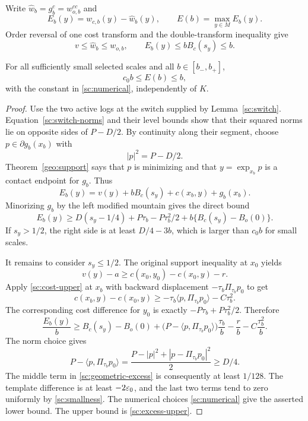 Write $\widehat w_b=g_b^c=w_{o,b}^{cc}$ and
\[
 E_b(y)=w_{c,b}(y)-\widehat w_b(y),\qquad
 E(b)=\max_{y\in M}E_b(y).
\]
Order reversal of one cost transform and the double-transform
inequality give
\begin{equation}
 v\leq\widehat w_b\leq w_{o,b},\qquad
 E_b(y)\leq bB_c(s_y)\leq b.
 \label{sc:excess-upper}
\end{equation}

\begin{lemma}\label{sc:excess}
For all sufficiently small selected scales and all
$b\in[b_-,b_+]$,
\begin{equation}
 c_0b\leq E(b)\leq b,
 \label{sc:excess-bounds}
\end{equation}
with the constant in \eqref{sc:numerical}, independently of $K$.
\end{lemma}

\begin{proof}
Use the two active logs at the switch supplied by
Lemma~\ref{sc:switch}.  Equation~\eqref{sc:switch-norms} and their
level bounds show that their squared norms lie on opposite sides of
$P-D/2$.  By continuity along their segment, choose
$p\in\partial g_b(x_b)$ with
\[
 |p|^2=P-D/2.
\]
Theorem~\ref{geo:support} says that $p$ is minimizing and that
$y=\exp_{x_b}p$ is a contact endpoint for $g_b$.  Thus
\[
 E_b(y)=v(y)+bB_c(s_y)+c(x_b,y)+g_b(x_b).
\]
Minorizing $g_b$ by the left modified mountain gives the direct bound
\begin{equation}
 E_b(y)\geq D(s_y-1/4)+P\tau_b-P\tau_b^2/2
                  +b\{B_c(s_y)-B_o(0)\}.
 \label{sc:direct-excess}
\end{equation}
If $s_y>1/2$, the right side is at least $D/4-3b$, which is larger
than $c_0b$ for small scales.

It remains to consider $s_y\leq1/2$.  The original support inequality
at $x_0$ yields
\[
 v(y)-a\geq c(x_0,y_0)-c(x_0,y)-r.
\]
Apply \eqref{sc:cost-upper} at $x_b$ with backward displacement
$-\tau_b\Pi_{\tau_b}p_0$ to get
\[
 c(x_b,y)-c(x_0,y)
       \geq-\tau_b\langle p,\Pi_{\tau_b}p_0\rangle-C\tau_b^2.
\]
The corresponding cost difference for $y_0$ is exactly
$-P\tau_b+P\tau_b^2/2$.  Therefore
\begin{equation}
 \frac{E_b(y)}b\geq B_c(s_y)-B_o(0)
   +\bigl(P-\langle p,\Pi_{\tau_b}p_0\rangle\bigr)\frac{\tau_b}b
   -\frac rb-C\frac{\tau_b^2}b.
 \label{sc:geometric-excess}
\end{equation}
The norm choice gives
\[
 P-\langle p,\Pi_{\tau_b}p_0\rangle
   =\frac{P-|p|^2+|p-\Pi_{\tau_b}p_0|^2}{2}\geq D/4.
\]
The middle term in \eqref{sc:geometric-excess} is consequently at
least $1/128$.  The template difference is at least $-2\varepsilon_0$,
and the last two terms tend to zero uniformly by
\eqref{sc:smallness}.  The numerical choices
\eqref{sc:numerical} give the asserted lower bound.
The upper bound is \eqref{sc:excess-upper}.
\end{proof}


